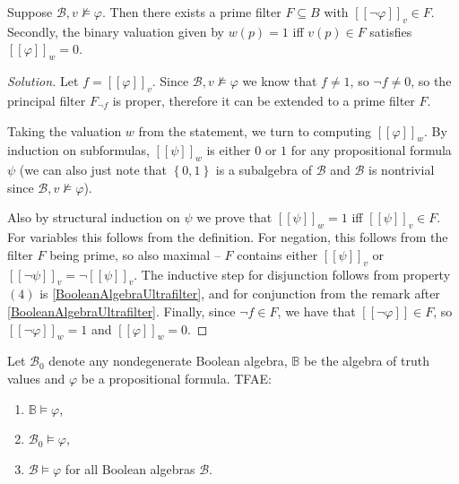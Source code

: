 \begin{problem}
    Suppose \( \mathcal{B}, v \not\models \varphi \). Then there exists a prime filter \( F \subseteq B \) with \( \left[ \left[ \neg\varphi \right] \right]_v \in F\). Secondly, the binary valuation given by \( w(p) = 1 \) iff \( v(p) \in F \) satisfies \( \left[ \left[ \varphi \right] \right]_w = 0 \).
\end{problem}

\begin{proof}[Solution]
    Let \( f = \left[ \left[ \varphi \right] \right]_v \). Since \( \mathcal{B}, v \not\models \varphi \) we know that \( f \neq 1 \), so \( \neg f \neq 0 \), so the principal filter \( F_{\neg f} \) is proper, therefore it can be extended to a prime filter \( F \). %

    Taking the valuation \( w \) from the statement, we turn to computing \( \left[ \left[ \varphi \right] \right]_w \). By induction on subformulas, \( \left[ \left[ \psi \right] \right]_w \) is either \( 0 \) or \( 1 \) for any propositional formula \( \psi \) (we can also just note that \( \left\{ 0,1 \right\} \) is a subalgebra of \( \mathcal{B} \) and \( \mathcal{B} \) is nontrivial since \( \mathcal{B}, v \not\models \varphi \)).
    
    Also by structural induction on \( \psi \) we prove that \( \left[ \left[ \psi \right] \right]_w = 1 \) iff \( \left[ \left[ \psi \right] \right]_v \in F \). For variables this follows from the definition. For negation, this follows from the filter \( F \) being prime, so also maximal -- \( F \) contains either \( \left[ \left[ \psi \right] \right]_v \) or \( \left[ \left[ \neg\psi \right] \right]_v = \neg \left[ \left[ \psi \right] \right]_v \). The inductive step for disjunction follows from property \( (4) \) is \ref{BooleanAlgebraUltrafilter}, and for conjunction from the remark after \ref{BooleanAlgebraUltrafilter}.
    Finally, since \( \neg f \in F \), we have that \( \left[ \left[ \neg\varphi \right] \right] \in F \), so \( \left[ \left[ \neg\varphi \right] \right]_w = 1 \) and \( \left[ \left[ \varphi \right] \right]_w = 0 \).
\end{proof}

\begin{problem}
    Let \( \mathcal{B}_0 \) denote any nondegenerate Boolean algebra, \( \mathbb{B} \) be the algebra of truth values and \( \varphi \) be a propositional formula. TFAE:
    \begin{enumerate}[label=(\roman*)]
        \item \( \mathbb{B} \models \varphi \),
        \item \( \mathcal{B}_0 \models \varphi \),
        \item \( \mathcal{B} \models \varphi \) for all Boolean algebras \( \mathcal{B} \).
    \end{enumerate}
\end{problem}

